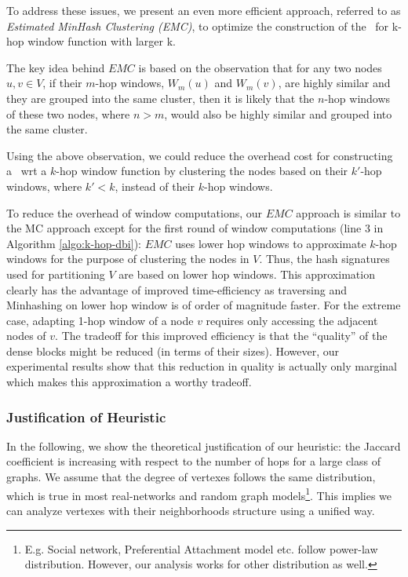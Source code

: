 To address these issues, we present an even more efficient approach,
referred to as {\it Estimated MinHash Clustering (EMC)}, 
to optimize the construction of the \DBIndex\ for k-hop window function with larger k.

The key idea behind $EMC$ is based on the observation that for any two nodes $u, v \in V$,
if their $m$-hop windows, $W_m(u)$ and $W_m(v)$, are highly similar 
and they are grouped into the same cluster, 
then it is likely that the $n$-hop windows of these two nodes, where $n > m$,
would also be highly similar and grouped into the same cluster.

Using the above observation, we could reduce the overhead cost for constructing a \DBIndex\ wrt a $k$-hop window 
function by clustering the nodes based on their $k'$-hop windows, where $k' < k$, instead of their $k$-hop windows.

To reduce the overhead of window computations,
our $EMC$ approach is similar to the MC approach except   
for the first round of window computations
(line 3 in Algorithm \ref{algo:k-hop-dbi}):
$EMC$ uses lower hop windows to approximate $k$-hop windows for the purpose of clustering the nodes in $V$.
Thus, the hash signatures used for partitioning $V$ are based on lower hop windows.
This approximation clearly has the advantage of improved time-efficiency as traversing and Minhashing on lower hop window is of
order of magnitude faster. For the extreme case, adapting 1-hop window of a node $v$ requires only accessing the adjacent nodes of $v$. 
The tradeoff for this improved efficiency is that the ``quality'' of the dense blocks might be reduced (in terms of their sizes).
However, our experimental results show that this reduction in quality is actually only marginal which makes this approximation a worthy tradeoff.


\subsubsection {Justification of Heuristic}
In the following, we show the theoretical justification of our heuristic: the Jaccard coefficient
is increasing with respect to the number of hops for a large class of graphs. We 
assume that the degree of vertexes follows the same distribution, which is true in most
real-networks and random graph models\footnote{E.g. Social network, Preferential Attachment model etc. follow
power-law distribution. However, our analysis works for other distribution as well.}.  
This implies we can analyze vertexes 
with their neighborhoods structure using a unified way. 

